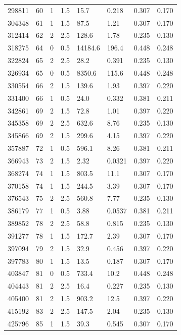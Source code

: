 \documentclass[preview]{standalone}
\begin{document}
{{{\begin{tabular}{L{1.2cm}C{1.2cm} C{0.3cm}C{0.5cm} C{1.4cm}C{1.4cm} C{1.4cm}C{1.4cm}}
  298811  &    60  & 1     & 1.5 &  15.7  & 0.218  & 0.307 &  0.170   \\ 
  304348  &    61  & 1     & 1.5 &  87.5  & 1.21  & 0.307 &  0.170   \\ 
  312414  &    62  & 2     & 2.5 &  128.6  & 1.78  & 0.235 &  0.130   \\ 
  318275  &    64  & 0     & 0.5 &  14184.6  & 196.4  & 0.448 &  0.248   \\ 
  322824  &    65  & 2     & 2.5 &  28.2  & 0.391  & 0.235 &  0.130   \\ 
  326934  &    65  & 0     & 0.5 &  8350.6  & 115.6  & 0.448 &  0.248   \\ 
  330554  &    66  & 2     & 1.5 &  139.6  & 1.93  & 0.397 &  0.220   \\ 
  331400  &    66  & 1     & 0.5 &  24.0  & 0.332  & 0.381 &  0.211   \\ 
  342861  &    69  & 2     & 1.5 &  72.8  & 1.01  & 0.397 &  0.220   \\ 
  345358  &    69  & 2     & 2.5 &  632.6  & 8.76  & 0.235 &  0.130   \\ 
  345866  &    69  & 2     & 1.5 &  299.6  & 4.15  & 0.397 &  0.220   \\ 
  357887  &    72  & 1     & 0.5 &  596.1  & 8.26  & 0.381 &  0.211   \\ 
  366943  &    73  & 2     & 1.5 &  2.32  & 0.0321  & 0.397 &  0.220   \\ 
  368274  &    74  & 1     & 1.5 &  803.5  & 11.1  & 0.307 &  0.170   \\ 
  370158  &    74  & 1     & 1.5 &  244.5  & 3.39  & 0.307 &  0.170   \\ 
  376543  &    75  & 2     & 2.5 &  560.8  & 7.77  & 0.235 &  0.130   \\ 
  386179  &    77  & 1     & 0.5 &  3.88  & 0.0537  & 0.381 &  0.211   \\ 
  389852  &    78  & 2     & 2.5 &  58.8  & 0.815  & 0.235 &  0.130   \\ 
  391277  &    78  & 1     & 1.5 &  172.7  & 2.39  & 0.307 &  0.170   \\ 
  397094  &    79  & 2     & 1.5 &  32.9  & 0.456  & 0.397 &  0.220   \\ 
  397783  &    80  & 1     & 1.5 &  13.5  & 0.187  & 0.307 &  0.170   \\ 
  403847  &    81  & 0     & 0.5 &  733.4  & 10.2  & 0.448 &  0.248   \\ 
  404443  &    81  & 2     & 2.5 &  16.4  & 0.227  & 0.235 &  0.130   \\ 
  405400  &    81  & 2     & 1.5 &  903.2  & 12.5  & 0.397 &  0.220   \\ 
  415192  &    83  & 2     & 2.5 &  147.5  & 2.04  & 0.235 &  0.130   \\ 
  425796  &    85  & 1     & 1.5 &  39.3  & 0.545  & 0.307 &  0.170   \\ 
\hline 
\end{tabular} 

}}}
\end{document}
